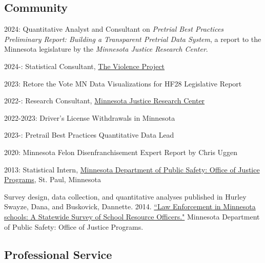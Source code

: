 \documentclass[letterpaper]{article}
\renewenvironment{itemize}{
  \begin{list}{}{
    \setlength{\leftmargin}{1.5em}
  }
}{
  \end{list}
}
\begin{document}
\subsection*{Community}

\begin{itemize}

\item 2024: Quantitative Analyst and Consultant on \textit{Pretrial Best Practices Preliminary Report: Building a Transparent Pretrial Data System}, a report to the Minnesota legislature by the \textit{Minnesota Justice Research Center}.
\item 2024-: Statistical Consultant, \href{https://www.theviolenceproject.org/}{The Violence Project}
\item 2023: Retore the Vote MN Data Visualizations for HF28 Legislative Report
\item 2022-: Research Consultant, \href{https://www.mnjrc.org/about-us}{Minnesota Justice Research Center}

\begin{itemize}

\item 2022-2023: Driver's License Withdrawals in Minnesota
\item 2023-: Pretrail Best Practices Quantitative Data Lead

\end{itemize}

\item 2020: Minnesota Felon Disenfranchisement Expert Report by Chris Uggen 

\item 2013: Statistical Intern, \href{https://dps.mn.gov/divisions/ojp/statistical-analysis-center/Pages/default.aspx}{Minnesota Department of Public Safety: Office of Justice Programs}, St. Paul, Minnesota
\begin{itemize}
	\item Survey design, data collection, and quantitative analyses published in Hurley Swayze, Dana, and  Buskovick, Dannette. 2014. \href{https://dps.mn.gov/divisions/ojp/forms-documents/Documents/SRO20REPORT.pdf}{``Law Enforcement in Minnesota schools: A Statewide Survey of School Resource Officers."} Minnesota Department of Public Safety: Office of Justice Programs.
\end{itemize}

\end{itemize}

\subsection*{Professional Service}
\end{document}
